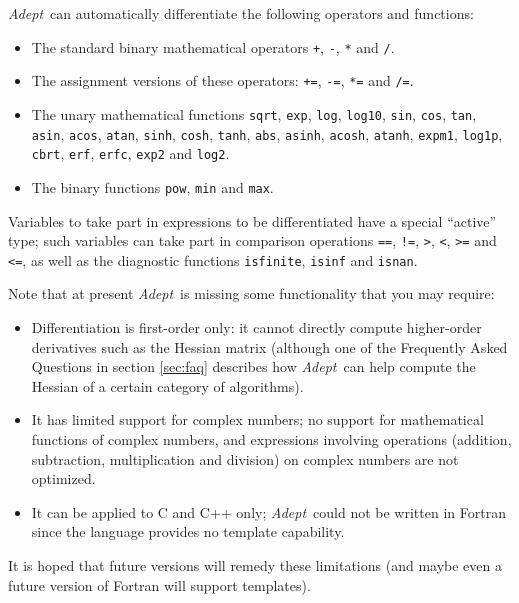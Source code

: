 \documentclass[a4,oneside]{book}
\def\codesize{\small}
\def\Adept{\emph{Adept}}
\def\code#1{{\codesize\texttt{#1}}}
\begin{document}
%
\Adept\ can automatically differentiate the following
operators and functions:
\begin{itemize}
\item The standard binary mathematical operators \code{+}, \code{-},
  \code{*} and \code{/}.
\item The assignment versions of these operators:
  \code{+=}, \code{-=}, \code{*=} and \code{/=}.
\item The unary mathematical functions \code{sqrt},
\code{exp}, \code{log}, \code{log10}, \code{sin}, \code{cos},
\code{tan}, \code{asin}, \code{acos}, \code{atan}, \code{sinh},
\code{cosh}, \code{tanh}, \code{abs}, \code{asinh}, \code{acosh}, \code{atanh},
\code{expm1}, \code{log1p}, \code{cbrt}, \code{erf}, \code{erfc},
\code{exp2} and \code{log2}. 
\item The binary functions \code{pow}, \code{min} and \code{max}.
\end{itemize}
Variables to take part in expressions to be differentiated have a
special ``active'' type; such variables can take part in comparison
operations \code{==}, \code{!=}, \code{>}, \code{<}, \code{>=} and
\code{<=}, as well as the diagnostic functions \code{isfinite},
\code{isinf} and \code{isnan}.

Note that at present \Adept\ is missing some functionality that you may
require:

\begin{itemize}
\item Differentiation is first-order only: it cannot directly compute
  higher-order derivatives such as the Hessian matrix (although one of
  the Frequently Asked Questions in section \ref{sec:faq} describes
  how \Adept\ can help compute the Hessian of a certain category of
  algorithms).
\item It has limited support for complex numbers; no support for
  mathematical functions of complex numbers, and expressions involving
  operations (addition, subtraction, multiplication and division) on
  complex numbers are not optimized.
\item It can be applied to C and C++ only; \Adept\ could not be
  written in Fortran since the language provides no template
  capability.
\end{itemize}%
%
It is hoped that future versions will remedy these limitations (and
maybe even a future version of Fortran will support templates).
\end{document}
